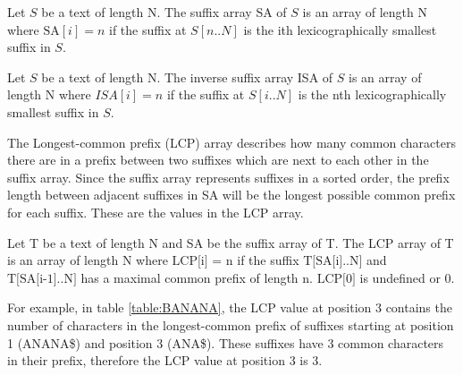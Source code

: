 \begin{definition} 

    Let $S$ be a text of length N. The suffix array SA of $S$ is an array of length N where
    $\text{SA}[i] = n$ if the suffix at $S[n..N]$ is the ith lexicographically smallest
    suffix in $S$.

\end{definition}

\begin{definition} 

    Let $S$ be a text of length N. The inverse suffix array ISA of $S$ is an array of length N
    where $ISA[i] = n$ if the suffix at $S[i..N]$ is the nth lexicographically smallest
    suffix in $S$.

\end{definition}

The Longest-common prefix (LCP) array describes how many common characters there are in a
prefix between two suffixes which are next to each other in the suffix array. Since the
suffix array represents suffixes in a sorted order, the prefix length between adjacent
suffixes in SA will be the longest possible common prefix for each suffix. These are the
values in the LCP array.

\begin{definition}
    Let T be a text of length N and SA be the suffix array of T.
    The LCP array of T is an array of length N where $\text{LCP[i] = n}$ if the suffix
    $\text{T[SA[i]..N]}$ and $\text{T[SA[i-1]..N]}$ has a maximal common prefix of length
    $\text{n}$. $\text{LCP[0]}$ is undefined or {0}.
\end{definition}

For example, in table \ref{table:BANANA}, the LCP value at position 3 contains the number
of characters in the longest-common prefix of suffixes starting at position 1 (ANANA\$)
and position 3 (ANA\$). These suffixes have 3 common characters in their prefix, therefore
the LCP value at position 3 is 3.

